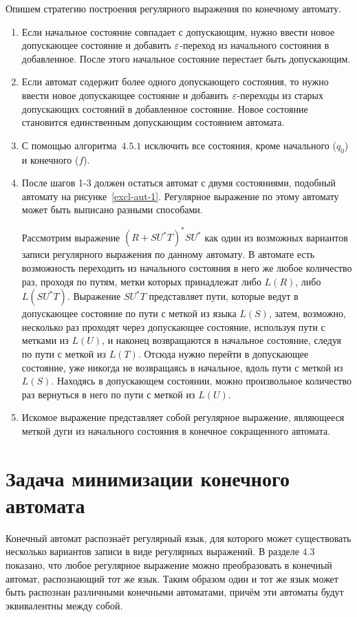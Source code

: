 Опишем стратегию построения регулярного выражения по конечному автомату.
\begin{enumerate}
	\item Если начальное состояние совпадает с допускающим, нужно ввести новое допускающее состояние и добавить $\varepsilon$-переход из начального состояния в добавленное. После этого начальное состояние перестает быть допускающим.
	\item Если автомат содержит более одного допускающего состояния, то нужно ввести новое допускающее состояние и добавить $\varepsilon$-переходы из старых допускающих состояний в добавленное состояние. Новое состояние становится единственным допускающим состоянием автомата.
	\item С помощью алгоритма~$4.5.1$ исключить все состояния, кроме начального ($q_0$) и конечного ($f$).
	\item После шагов 1-3 должен остаться автомат с двумя состояниями, подобный автомату на рисунке~\ref{excl-aut-1}. Регулярное выражение по этому автомату может быть выписано разными способами.

Рассмотрим выражение $(R + SU^*T)^*SU^*$ как один из возможных вариантов записи регулярного выражения по данному автомату. В автомате есть возможность переходить из начального состояния в него же любое количество раз, проходя по путям, метки которых принадлежат либо $L(R)$, либо $L(SU^*T)$. Выражение $SU^*T$ представляет пути, которые ведут в допускающее состояние по пути с меткой из языка $L(S)$, затем, возможно, несколько раз проходят через допускающее состояние, используя пути с метками из $L(U)$, и наконец возвращаются в начальное состояние, следуя по пути с меткой из $L(T)$. Отсюда нужно перейти в допускающее состояние, уже никогда не возвращаясь в начальное, вдоль пути с меткой из $L(S)$. Находясь в допускающем состоянии, можно произвольное количество раз вернуться в него по пути с меткой из $L(U)$.

\item Искомое выражение представляет собой регулярное выражение, являющееся меткой дуги из начального состояния в конечное сокращенного автомата.
\end{enumerate}

\section{Задача минимизации конечного автомата}
\label{Chapter4FALMin}
Конечный автомат распознаёт регулярный язык, для которого может существовать несколько вариантов записи в виде регулярных выражений. В разделе $4.3$ показано, что любое регулярное выражение можно преобразовать в конечный автомат, распознающий тот же язык. Таким образом один и тот же язык может быть распознан различными конечными автоматами, причём эти автоматы будут эквивалентны между собой.

